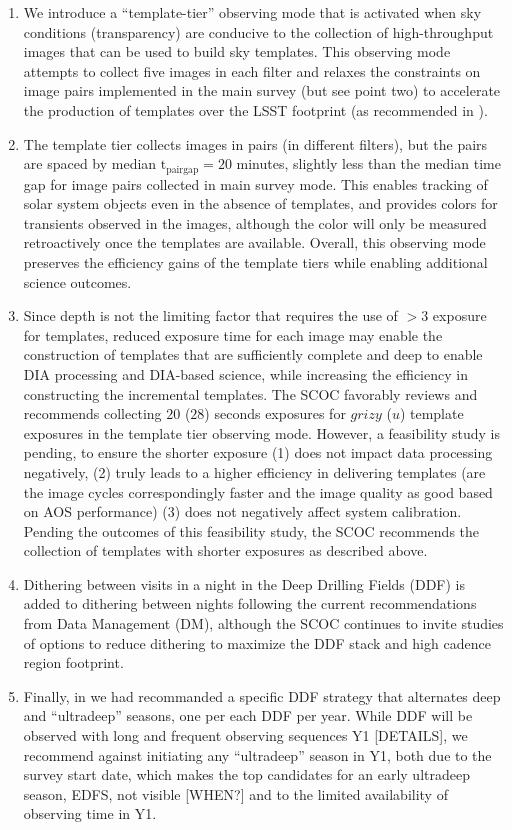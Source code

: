 \documentclass[SE,lsstdraft,authoryear,toc]{lsstdoc}
\newcommand{\new}[1]{{\color{blue} #1}}
\begin{document}
\begin{enumerate}
\item We introduce a ``template-tier'' observing mode that is activated when sky conditions (transparency) are conducive to the collection of high-throughput images that can be used to build sky templates. This observing mode attempts to collect five images in each filter and relaxes the constraints on image pairs implemented in the main survey (but see point two) to accelerate the production of templates over the LSST footprint (as recommended in ).

\item The template tier collects images in pairs (in different filters), but the pairs are spaced by median $\mathrm{t_{pair gap}}=20$ minutes, slightly less than the median time gap for image pairs collected in main survey mode. This enables tracking of solar system objects even in the absence of templates, and provides colors for transients observed in the images, although the color will only be measured retroactively once the templates are available. Overall, this observing mode preserves the efficiency gains of the template tiers while enabling additional science outcomes. 

\item Since depth is not the limiting factor that requires the use of $>3$ exposure for templates, reduced exposure time for each image may enable the construction of templates that are sufficiently complete and deep to enable DIA processing and DIA-based science, while increasing the efficiency in constructing the incremental templates. The SCOC favorably reviews and recommends collecting $20$ ($28$) seconds exposures for $grizy$ ($u$) template exposures in the template tier observing mode. However, a feasibility study is pending, to ensure the shorter exposure (1) does not impact data processing negatively, (2) truly leads to a higher efficiency in delivering templates (\eg are the image cycles correspondingly faster and the image quality as good based on AOS performance) (3) does not negatively affect system calibration. Pending the outcomes of this feasibility study, the SCOC recommends the collection of templates with shorter exposures as described above.
\item Dithering between visits in a night in the Deep Drilling Fields (DDF) is added to dithering between nights following the current recommendations from Data Management (DM), although the SCOC continues to invite studies of options to reduce dithering to maximize the DDF stack and high cadence region footprint.
\item \new{Finally, in  we had recommanded a specific DDF strategy that alternates deep and ``ultradeep'' seasons, one per each DDF per year. While DDF will be observed with long and frequent observing sequences Y1 [DETAILS], we recommend against initiating any ``ultradeep'' season in Y1, both due to the survey start date, which makes the top candidates for an early ultradeep season, EDFS, not visible [WHEN?] and to the limited availability of observing time in Y1.} 
\end{enumerate}
\end{document}
